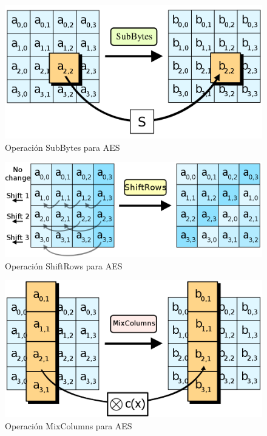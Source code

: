 \begin{figure}[ht]
  \centering
  \includegraphics[scale=0.25]{Figures/SubBytes}
  \decoRule
  \caption[SubBytes (AES)]{Operación SubBytes para AES \emph{\parencite{Reference27}}}
  \label{fig:SubBytes}
\end{figure}

\begin{figure}[ht]
  \centering
  \includegraphics[scale=0.25]{Figures/ShiftRows}
  \decoRule
  \caption[ShiftRows (AES)]{Operación ShiftRows para AES \emph{\parencite{Reference28}}}
  \label{fig:ShiftRows}
\end{figure}

\begin{figure}[ht]
  \centering
  \includegraphics[scale=0.25]{Figures/MixColumns}
  \decoRule
  \caption[MixColumns (AES)]{Operación MixColumns para AES \emph{\parencite{Reference29}}}
  \label{fig:MixColumns}
\end{figure}


